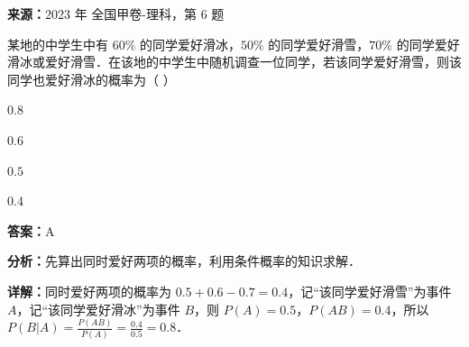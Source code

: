 \begin{question}[points=5]
\textbf{来源：}2023 年 全国甲卷-理科，第 6 题\par
某地的中学生中有 $60\%$ 的同学爱好滑冰，$50\%$ 的同学爱好滑雪，$70\%$ 的同学爱好滑冰或爱好滑雪．在该地的中学生中随机调查一位同学，若该同学爱好滑雪，则该同学也爱好滑冰的概率为（                                                        ）
\begin{choices}
  \item $0.8$
  \item $0.6$
  \item $0.5$
  \item $0.4$
\end{choices}
\begin{solution}
\textbf{答案：}A

\textbf{分析：}先算出同时爱好两项的概率，利用条件概率的知识求解．

\textbf{详解：}同时爱好两项的概率为 $0.5 + 0.6 - 0.7 = 0.4$，记“该同学爱好滑雪”为事件 $A$，记“该同学爱好滑冰”为事件 $B$，则 $P(A)=0.5$，$P(AB)=0.4$，所以 $P(B|A) = \frac{P(AB)}{P(A)} = \frac{0.4}{0.5} = 0.8$．
\end{solution}
\end{question}


